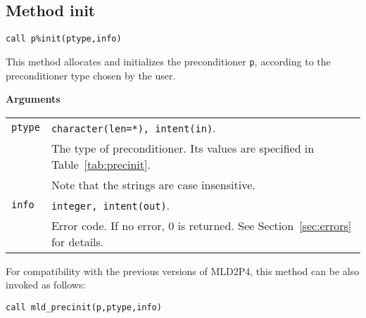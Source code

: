 \subsection{Method init\label{sec:precinit}}

\begin{center}
\verb|call p%init(ptype,info)|
\end{center}

\noindent
This method allocates and initializes the preconditioner
\verb|p|, according to the preconditioner type chosen by the user.

{\baselineskip\noindent\large\bfseries Arguments} \smallskip

\begin{tabular}{p{1.2cm}p{12cm}}
\verb|ptype|  & \verb|character(len=*), intent(in)|.\\
              & The type of preconditioner. Its values are specified
              in Table~\ref{tab:precinit}.\\
              & Note that the strings are case insensitive.\\
\verb|info|   & \verb|integer, intent(out)|.\\
              & Error code. If no error, 0 is returned. See Section~\ref{sec:errors} for details.\\
\end{tabular}

\baselineskip
For compatibility with the previous versions of MLD2P4, this method can be also invoked
as follows:

\begin{center}
\verb|call mld_precinit(p,ptype,info)|
\end{center}


